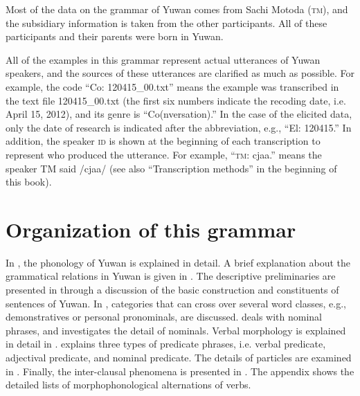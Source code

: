 Most of the data on the grammar of Yuwan comes from Sachi Motoda (\textsc{tm}), and the subsidiary information is taken from the other participants. All of these participants and their parents were born in Yuwan.

All of the examples in this grammar represent actual utterances of Yuwan speakers, and the sources of these utterances are clarified as much as possible. For example, the code “Co: 120415\_00.txt” means the example was transcribed in the text file 120415\_00.txt (the first six numbers indicate the recoding date, i.e. April 15, 2012), and its genre is “Co(nversation).” In the case of the elicited data, only the date of research is indicated after the abbreviation, e.g., “El: 120415.” In addition, the speaker \textsc{id} is shown at the beginning of each transcription to represent who produced the utterance. For example, “\textsc{tm}: cjaa.” means the speaker TM said /cjaa/ (see also “Transcription methods” in the beginning of this book).

\section{Organization of this grammar}
\hypertarget{RefHeadingToc395696959}{}
In , the phonology of Yuwan is explained in detail. A brief explanation about the grammatical relations in Yuwan is given in . The descriptive preliminaries are presented in  through a discussion of the basic construction and constituents of sentences of Yuwan. In , categories that can cross over several word classes, e.g., demonstratives or personal pronominals, are discussed.  deals with nominal phrases, and  investigates the detail of nominals. Verbal morphology is explained in detail in .  explains three types of predicate phrases, i.e. verbal predicate, adjectival predicate, and nominal predicate. The details of particles are examined in . Finally, the inter-clausal phenomena is presented in . The appendix shows the detailed lists of morphophonological alternations of verbs.
